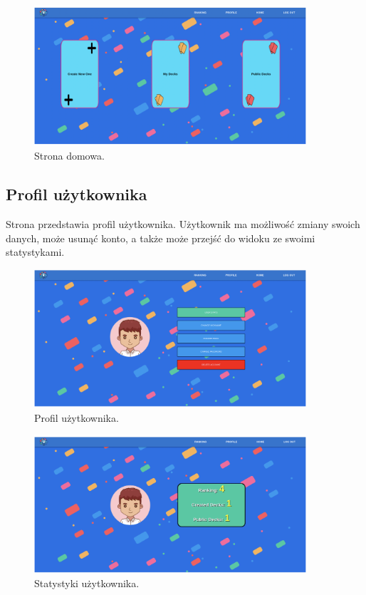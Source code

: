 \begin{figure}[H]
    \centering
    \includegraphics[width=0.9\textwidth]{chapters/chapter_10/images_web/web_home}
    \caption{Strona domowa.}
    \label{img:web_home}
\end{figure}


\subsection{Profil użytkownika}
Strona przedstawia profil użytkownika. Użytkownik ma możliwość zmiany swoich
danych, może usunąć konto, a także może przejść do widoku ze swoimi statystykami.


\begin{figure}[H]
    \centering
    \includegraphics[width=0.9\textwidth]{chapters/chapter_10/images_web/web_profile}
    \caption{Profil użytkownika.}
    \label{img:web_profile}
\end{figure}


\begin{figure}[H]
    \centering
    \includegraphics[width=0.9\textwidth]{chapters/chapter_10/images_web/web_stats}
    \caption{Statystyki użytkownika.}
    \label{img:web_stats}
\end{figure}


